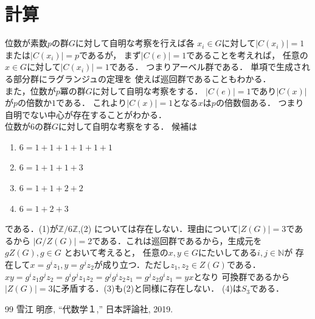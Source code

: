 \documentclass[dvipdfmx,a4paper,12pt]{jsarticle}
\begin{document}
\section{計算}
位数が素数$p$の群$G$に対して自明な考察を行えば各
$x_i\in G$に対して$|C(x_i)|=1$または$|C(x_i)|=p$であるが，
まず$|C(e)|=1$であることを考えれば，
任意の$x\in G$に対して$|C(x_i)|=1$である．
つまりアーベル群である．
単項で生成される部分群にラグランジュの定理を
使えば巡回群であることもわかる．
\\
また，位数が$p$冪の群$G$に対して自明な考察をする．
$|C(e)|=1$であり$|C(x)|$が$p$の倍数か$1$である．
これより$|C(x)|=1$となる$x$は$p$の倍数個ある．
つまり自明でない中心が存在することがわかる．\\
位数が$6$の群$G$に対して自明な考察をする．
候補は
\begin{enumerate}
    \item $6=1+1+1+1+1+1$
    \item $6=1+1+1+3$
    \item $6=1+1+2+2$
    \item $6=1+2+3$
\end{enumerate}
である．(1)が$\mathbb{Z}/6\mathbb{Z}$,(2)
については存在しない．理由について$|Z(G)|=3$であるから
$|G/Z(G)|=2$である．これは巡回群であるから，生成元を$gZ(G),g\in G $
とおいて考えると，
任意の$x,y\in G$にたいしてある$i,j\in \mathbb{N}$が
存在して$x=g^iz_1,y=g^jz_2$が成り立つ．ただし$z_1,z_2\in Z(G)$である．
$xy=g^iz_1g^jz_2=g^ig^jz_1z_2=g^jg^iz_2z_1=g^jz_2g^iz_1=yx$となり
可換群であるから$|Z(G)|=3$に矛盾する．(3)も(2)と同様に存在しない．
(4)は$S_3$である．
\begin{thebibliography}{99}
 雪江 明彦, ``代数学１,'' 日本評論社, 2019.
\end{thebibliography}
\end{document}
